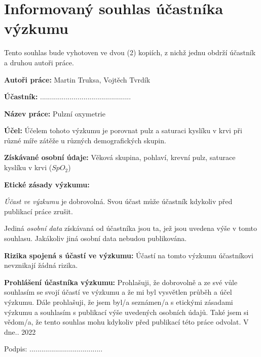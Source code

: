 \section{Informovaný souhlas účastníka výzkumu}
\noindent Tento souhlas bude vyhotoven ve dvou (2) kopiích, z nichž jednu obdrží účastník a druhou autoři práce.\par
\noindent\textbf{Autoři práce: } Martin Truksa, Vojtěch Tvrdík\par
\noindent\textbf{Účastník: }..............................................\par
\noindent\textbf{Název práce: } Pulzní oxymetrie\par
\noindent\textbf{Účel: } Účelem tohoto výzkumu je porovnat pulz a saturaci kyslíku v krvi při různé míře zátěže u různých demografických skupin.\par
\noindent\textbf{Získávané osobní údaje: } Věková skupina, pohlaví, krevní pulz, saturace kyslíku v krvi (\(SpO_2\))\par
\noindent\textbf{Etické zásady výzkumu: }\par
\emph{Účast ve výzkumu} je dobrovolná. Svou účast může účastník kdykoliv před publikací práce zrušit.\par
Jediná \emph{osobní data} získávaná od účastníka jsou ta, jež jsou uvedena výše v tomto souhlasu. Jakákoliv jiná osobní data nebudou publikována.\par
\noindent\textbf{Rizika spojená s účastí ve výzkumu: } Účastí na tomto výzkumu účastníkovi nevznikají žádná rizika.\par
\noindent\textbf{Prohlášení účastníka výzkumu: } Prohlašuji, že dobrovolně a ze své vůle souhlasím se svojí účastí ve výzkumu a že mi byl vysvětlen průběh a účel výzkumu. Dále prohlašuji, že jsem byl/a seznámen/a s etickými zásadami výzkumu a souhlasím s publikací výše uvedených osobních údajů. Také jsem si vědom/a, že tento souhlas mohu kdykoliv před publikací této práce odvolat.
\vfill
\noindent V \hspace{4.5cm} dne\hspace{0.7cm}.\hspace{0.7cm}. 2022
\begin{flushright}Podpis: .....................................\end{flushright}